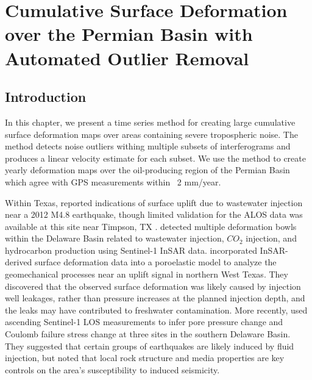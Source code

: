 
\chapter{Cumulative Surface Deformation over the Permian Basin with Automated Outlier Removal}
\label{CHAP:4-GRL}

\section{Introduction}




In this chapter,  we present a time series method for creating large cumulative surface deformation maps over areas containing severe tropospheric noise. The method detects noise outliers withing multiple subsets of interferograms and produces a linear velocity estimate for each subset.  We use the method to create yearly deformation maps over the oil-producing region of the Permian Basin which agree with GPS measurements within ~2 mm/year.



Within Texas, \cite{Shirzaei2016SurfaceUpliftTime} reported indications of surface uplift due to wastewater injection near a 2012 M4.8 earthquake, though limited validation for the ALOS data was available at this site near Timpson, TX \citep{Semple2017IncompleteInventorySuspected}. \cite{Kim2018AssociationLocalizedGeohazards} detected multiple deformation bowls within the Delaware Basin related to wastewater injection, $CO_2$ injection, and hydrocarbon production using Sentinel-1 InSAR data. \cite{Zheng2019WastewaterLeakageWest} incorporated InSAR-derived surface deformation data into a poroelastic model to analyze the geomechanical processes near an uplift signal in northern West Texas. They discovered that the observed surface deformation was likely caused by injection well leakages, rather than pressure increases at the planned injection depth, and the leaks may have contributed to freshwater contamination. More recently, \cite{Deng2020SurfaceDeformationInduced} used ascending Sentinel-1 LOS measurements to infer pore pressure change and Coulomb failure stress change at three sites in the southern Delaware Basin. They suggested that certain groups of earthquakes are likely induced by fluid injection, but noted that local rock structure and media properties are key controls on the area's susceptibility to induced seismicity.

